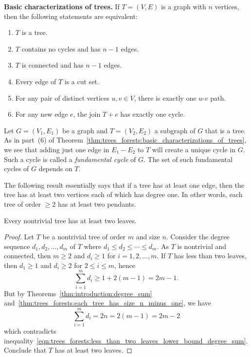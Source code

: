 \begin{theorem}
\label{thm:trees_forests:basic_characterizations_of_trees}
\textbf{Basic characterizations of trees.}
If $T = (V, E)$ is a graph with $n$ vertices, then the following
statements are equivalent:
\begin{enumerate}
\item $T$ is a tree.

\item $T$ contains no cycles and has $n - 1$ edges.

\item $T$ is connected and has $n - 1$ edges.

\item Every edge of $T$ is a cut set.

\item For any pair of distinct vertices $u,v \in V$, there is exactly
  one $u$-$v$ path.

\item For any new edge $e$, the join $T + e$ has exactly one cycle.
\end{enumerate}
\end{theorem}

Let $G = (V_1, E_1)$ be a graph and $T = (V_2, E_2)$ a subgraph of $G$
that is a tree. As in part~(6) of
Theorem~\ref{thm:trees_forests:basic_characterizations_of_trees}, we
see that adding just one edge in $E_1 - E_2$ to $T$ will create a
unique cycle in $G$. Such a cycle is called a
\emph{fundamental cycle} of $G$. The set of
such fundamental cycles of $G$ depends on $T$.

The following result essentially says that if a tree has at least one
edge, then the tree has at least two vertices each of which has degree
one. In other words, each tree of order $\geq 2$ has at least two
pendants.

\begin{theorem}
Every nontrivial tree has at least two leaves.
\end{theorem}

\begin{proof}
Let $T$ be a nontrivial tree of order $m$ and size $n$. Consider the
degree sequence $d_1, d_2, \dots, d_m$ of $T$ where
$d_1 \leq d_2 \leq \cdots \leq d_m$. As $T$ is nontrivial and
connected, then $m \geq 2$ and $d_i \geq 1$ for $i = 1, 2, \dots, m$.
If $T$ has less than two leaves, then $d_1 \geq 1$ and $d_i \geq 2$
for $2 \leq i \leq m$, hence
\begin{equation}
\label{eqn:trees_forests:less_than_two_leaves_lower_bound_degree_sum}
\sum_{i=1}^m d_i
\geq
1 + 2(m-1)
=
2m - 1.
\end{equation}
But by Theorems~\ref{thm:introduction:degree_sum}
and~\ref{thm:trees_forests:each_tree_has_size_n_minus_one}, we have
\[
\sum_{i=1}^m d_i
=
2n
=
2(m - 1)
=
2m - 2
\]
which contradicts
inequality~\eqref{eqn:trees_forests:less_than_two_leaves_lower_bound_degree_sum}.
Conclude that $T$ has at least two leaves.
\end{proof}

